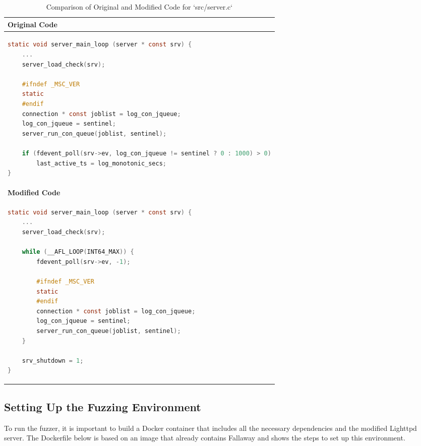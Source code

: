 \begin{table}[H]
\centering
\begin{tabular}{|p{}|}
\hline
\textbf{Original Code} \\
\hline
\begin{lstlisting}[language=c, basicstyle=\footnotesize, breaklines=true]
static void server_main_loop (server * const srv) {
    ...
    server_load_check(srv);

    #ifndef _MSC_VER
    static
    #endif
    connection * const joblist = log_con_jqueue;
    log_con_jqueue = sentinel;
    server_run_con_queue(joblist, sentinel);

    if (fdevent_poll(srv->ev, log_con_jqueue != sentinel ? 0 : 1000) > 0)
        last_active_ts = log_monotonic_secs;
}
\end{lstlisting} \\
\hline
\textbf{Modified Code} \\
\hline
\begin{lstlisting}[language=c, basicstyle=\footnotesize, breaklines=true]
static void server_main_loop (server * const srv) {
    ...
    server_load_check(srv);

    while (__AFL_LOOP(INT64_MAX)) {
        fdevent_poll(srv->ev, -1);
        
        #ifndef _MSC_VER
        static
        #endif
        connection * const joblist = log_con_jqueue;
        log_con_jqueue = sentinel;
        server_run_con_queue(joblist, sentinel);
    }

    srv_shutdown = 1;
}
\end{lstlisting} \\
\hline
\end{tabular}
\caption{Comparison of Original and Modified Code for `src/server.c`}
\label{tab:server_patch}
\end{table}

\subsection{Setting Up the Fuzzing Environment}

To run the fuzzer, it is important to build a Docker container that includes all the necessary dependencies and the modified Lighttpd server. The Dockerfile below is based on an image that already contains Fallaway and shows the steps to set up this environment.

